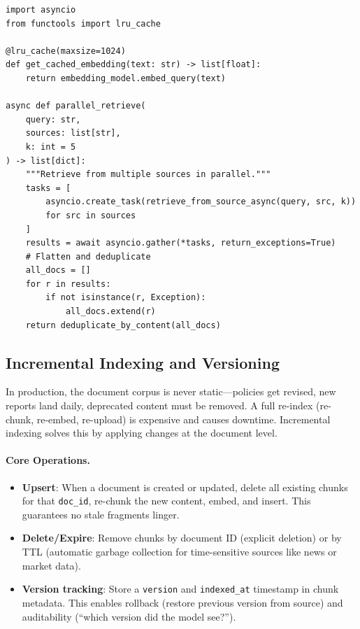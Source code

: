 \begin{lstlisting}[style=pythonstyle, caption={Async parallel retrieval for low latency}, label=lst:async_retrieve]
import asyncio
from functools import lru_cache

@lru_cache(maxsize=1024)
def get_cached_embedding(text: str) -> list[float]:
    return embedding_model.embed_query(text)

async def parallel_retrieve(
    query: str,
    sources: list[str],
    k: int = 5
) -> list[dict]:
    """Retrieve from multiple sources in parallel."""
    tasks = [
        asyncio.create_task(retrieve_from_source_async(query, src, k))
        for src in sources
    ]
    results = await asyncio.gather(*tasks, return_exceptions=True)
    # Flatten and deduplicate
    all_docs = []
    for r in results:
        if not isinstance(r, Exception):
            all_docs.extend(r)
    return deduplicate_by_content(all_docs)
\end{lstlisting}

\subsection{Incremental Indexing and Versioning}
\label{incremental-indexing-and-versioning}

In production, the document corpus is never static---policies get revised, new reports land daily, deprecated content must be removed. A full re-index (re-chunk, re-embed, re-upload) is expensive and causes downtime. Incremental indexing solves this by applying changes at the document level.

\paragraph{Core Operations.}
\label{core-operations.}

\begin{itemize}
  \item \textbf{Upsert}: When a document is created or updated, delete all existing chunks for that \texttt{doc\_id}, re-chunk the new content, embed, and insert. This guarantees no stale fragments linger.
  \item \textbf{Delete/Expire}: Remove chunks by document ID (explicit deletion) or by TTL (automatic garbage collection for time-sensitive sources like news or market data).
  \item \textbf{Version tracking}: Store a \texttt{version} and \texttt{indexed\_at} timestamp in chunk metadata. This enables rollback (restore previous version from source) and auditability (``which version did the model see?'').
\end{itemize}

